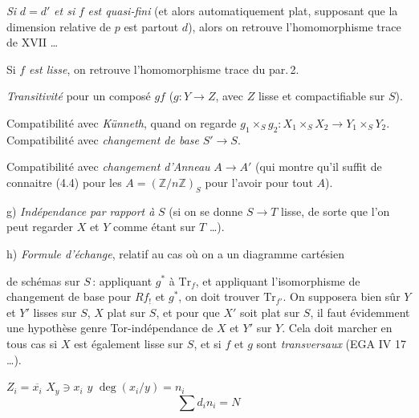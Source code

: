 \documentclass[11pt,a4paper]{article}
\begin{document}
 \emph{Si} $d = d'$ \emph{et si} $f$ \emph{est quasi-fini} (et
alors automatiquement plat, supposant que la dimension relative de $p$ est
partout $d$), alors on retrouve l'homomorphisme trace de XVII …

 Si $f$ \emph{est lisse}, on retrouve l'homomorphisme trace du
par.\,2.

 \emph{Transitivité} pour un composé $gf$ ($g\colon Y \to Z$, avec
$Z$ lisse et compactifiable sur $S$).

 Compatibilité avec \emph{Künneth}, quand on regarde
$g_1 \times_S g_2\colon X_1 \times_S X_2 \to Y_1 \times_S Y_2$.
Compatibilité avec \emph{changement de base} $S' \to S$.

 Compatibilité avec \emph{changement d'Anneau} $A \to A'$ (qui
montre qu'il suffit de connaitre (4.4) pour les
$A = (\mathbb{Z}/n\mathbb{Z})_S$ pour l'avoir pour tout $A$).

g) \emph{Indépendance par rapport à} $S$ (si on se donne $S \to T$ lisse,
de sorte que l'on peut regarder $X$ et $Y$ comme étant sur $T$ …).

h) \emph{Formule d'échange}, relatif au cas où on a un diagramme cartésien


de schémas sur $S$\,: appliquant $g^{*}$ à $\mathrm{Tr}_f$, et
appliquant l'isomorphisme de changement de base pour $Rf_{!}$ et $g^{*}$,
on doit trouver $\mathrm{Tr}_{f'}$. On supposera bien sûr $Y$ et $Y'$
lisses sur $S$, $X$ plat sur $S$, et pour que $X'$ soit plat sur $S$, il
faut évidemment une hypothèse genre Tor-indépendance de $X$ et $Y'$ sur
$Y$. Cela doit marcher en tous cas si $X$ est également lisse sur $S$, et
si $f$ et $g$ sont \emph{transversaux} (EGA IV 17 …).


$Z_i = \overline{x_i}$ \qquad $X_y \ni x_i$ \qquad $y$ \qquad
$\deg(x_i/y) = n_i$
\[
\textstyle\sum d_i n_i = N
\]
\end{document}
